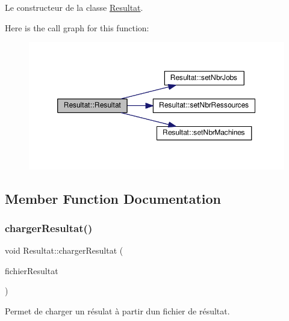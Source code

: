 Le constructeur de la classe \hyperlink{classResultat}{Resultat}. 

Here is the call graph for this function\+:\nopagebreak
\begin{figure}[H]
\begin{center}
\leavevmode
\includegraphics[width=350pt]{classResultat_acc2413409ddb57b3d1ac405d8bdfb922_cgraph}
\end{center}
\end{figure}


\subsection{Member Function Documentation}
\mbox{\label{classResultat_afce37c00573db2aa3f96dd5d69f50d40}} 
\subsubsection{\texorpdfstring{charger\+Resultat()}{chargerResultat()}}
{\footnotesize\ttfamily void Resultat\+::charger\+Resultat (\begin{DoxyParamCaption}\item[{Q\+String}]{fichier\+Resultat }\end{DoxyParamCaption})}



Permet de charger un résulat à partir d\textquotesingle{}un fichier de résultat. 


